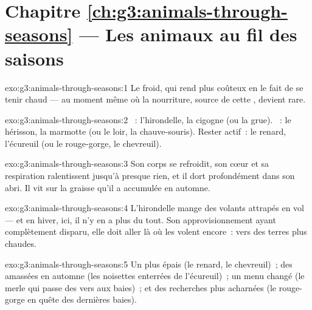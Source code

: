 \section*{Chapitre \ref{ch:g3:animals-through-seasons} --- Les animaux au fil des saisons}

\begin{solution}{exo:g3:animals-through-seasons:1}
Le froid, qui rend plus coûteux en  le fait de se tenir chaud
--- au moment même où la nourriture, source de cette ,
devient rare.
\end{solution}

\begin{solution}{exo:g3:animals-through-seasons:2}
~: l'hirondelle, la cigogne (ou la grue). ~: le
hérisson, la marmotte (ou le loir, la chauve-souris). Rester actif~:
le renard, l'écureuil (ou le rouge-gorge, le chevreuil).
\end{solution}

\begin{solution}{exo:g3:animals-through-seasons:3}
Son corps se refroidit, son cœur et sa respiration ralentissent
jusqu'à presque rien, et il dort profondément dans son abri. Il vit
sur la graisse qu'il a accumulée en automne.
\end{solution}

\begin{solution}{exo:g3:animals-through-seasons:4}
L'hirondelle mange des  volants attrapés en vol --- et en
hiver, ici, il n'y en a plus du tout. Son approvisionnement ayant
complètement disparu, elle doit aller là où les  volent
encore~: vers des terres plus chaudes.
\end{solution}

\begin{solution}{exo:g3:animals-through-seasons:5}
Un  plus épais (le renard, le chevreuil)~; des
 amassées en automne (les noisettes enterrées
de l'écureuil)~; un menu changé (le merle qui passe des vers aux
baies)~; et des recherches plus acharnées (le rouge-gorge en quête
des dernières baies).
\end{solution}

